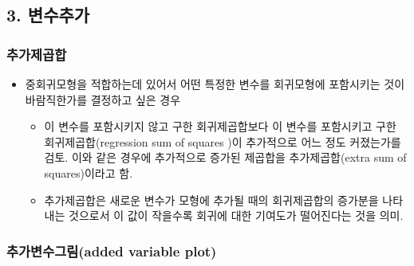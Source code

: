\documentclass[
]{article}
\providecommand{\tightlist}{%
  \setlength{\itemsep}{0pt}\setlength{\parskip}{0pt}}
\begin{document}
\hypertarget{uxbcc0uxc218uxcd94uxac00}{%
\subsection{3. 변수추가}\label{uxbcc0uxc218uxcd94uxac00}}

\hypertarget{uxcd94uxac00uxc81cuxacf1uxd569}{%
\subsubsection{추가제곱합}\label{uxcd94uxac00uxc81cuxacf1uxd569}}

\begin{itemize}
\tightlist
\item
  중회귀모형을 적합하는데 있어서 어떤 특정한 변수를 회귀모형에
  포함시키는 것이 바람직한가를 결정하고 싶은 경우

  \begin{itemize}
  \tightlist
  \item
    이 변수를 포함시키지 않고 구한 회귀제곱합보다 이 변수를 포함시키고
    구한 회귀제곱합(regression sum of squares )이 추가적으로 어느 정도
    커졌는가를 검토. 이와 같은 경우에 추가적으로 증가된 제곱합을
    추가제곱합(extra sum of squares)이라고 함.
  \item
    추가제곱합은 새로운 변수가 모형에 추가될 때의 회귀제곱합의 증가분을
    나타내는 것으로서 이 값이 작을수록 회귀에 대한 기여도가 떨어진다는
    것을 의미.
  \end{itemize}
\end{itemize}

\hypertarget{uxcd94uxac00uxbcc0uxc218uxadf8uxb9bcadded-variable-plot}{%
\subsubsection{추가변수그림(added variable
plot)}\label{uxcd94uxac00uxbcc0uxc218uxadf8uxb9bcadded-variable-plot}}
\end{document}
